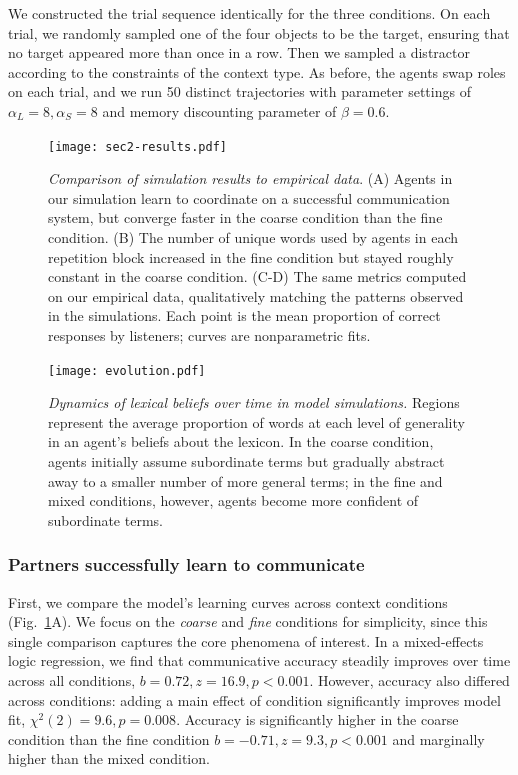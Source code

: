 We constructed the trial sequence identically for the three conditions. 
On each trial, we randomly sampled one of the four objects to be the target, ensuring that no target appeared more than once in a row.
Then we sampled a distractor according to the constraints of the context type.
As before, the agents swap roles on each trial, and we run 50 distinct trajectories with parameter settings of $\alpha_L=8, \alpha_S=8$ and memory discounting parameter of $\beta = 0.6$.%


\begin{figure}[t]
\begin{center}
\texttt{[image: sec2-results.pdf]}
\caption{\emph{Comparison of simulation results to empirical data}. (A) Agents in our simulation learn to coordinate on a successful communication system, but converge faster in the coarse condition than the fine condition.  (B) The number of unique words used by agents in each repetition block increased in the fine condition but stayed roughly constant in the coarse condition. (C-D) The same metrics computed on our empirical data, qualitatively matching the patterns observed in the simulations. Each point is the mean proportion of correct responses by listeners; curves are nonparametric fits.}
\label{fig:sec2Results}
\end{center}
\end{figure}

\begin{figure}[h]
\begin{center}
\texttt{[image: evolution.pdf]}
\caption{\emph{Dynamics of lexical beliefs over time in model simulations.} Regions represent the average proportion of words at each level of generality in an agent's beliefs about the lexicon. In the coarse condition, agents initially assume subordinate terms but gradually abstract away to a smaller number of more general terms; in the fine and mixed conditions, however, agents become more confident of subordinate terms.}
\label{fig:evolution}
\end{center}
\end{figure}

\subsubsection{Partners successfully learn to communicate}

First, we compare the model's learning curves across context conditions (Fig.~\ref{fig:sec2Results}A). 
We focus on the \emph{coarse} and \emph{fine} conditions for simplicity, since this single comparison captures the core phenomena of interest.
In a mixed-effects logic regression, we find that communicative accuracy steadily improves over time across all conditions, $b=0.72, z = 16.9, p<0.001$.
However, accuracy also differed across conditions: adding a main effect of condition significantly improves model fit, $\chi^2(2) = 9.6, p = 0.008$. 
Accuracy is significantly higher in the coarse condition than the fine condition $b=-0.71, z=9.3, p <0.001$ and marginally higher than the mixed condition.

